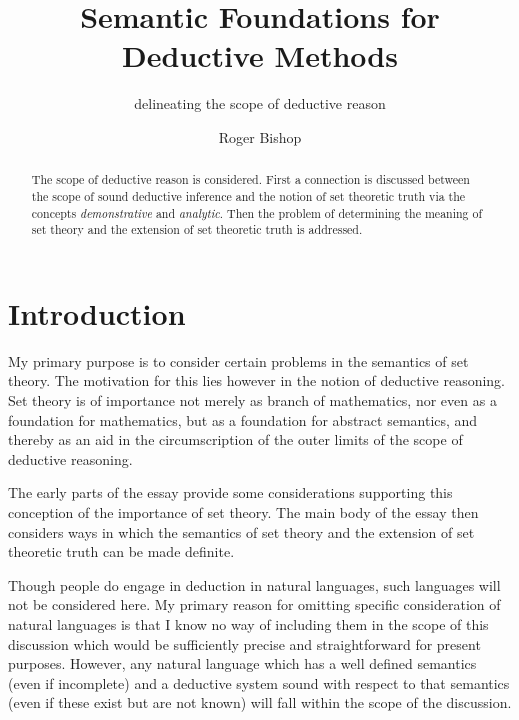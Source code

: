 \documentclass[numreferences]{rbjk}
\begin{document}
                                                                                   
\begin{article}
\begin{opening}  
\title{Semantic Foundations for Deductive Methods}
\subtitle{delineating the scope of deductive reason}
\author{Roger Bishop }

\begin{abstract}

The scope of deductive reason is considered.
First a connection is discussed between the scope of sound deductive inference and the notion of set theoretic truth via the concepts {\it demonstrative} and {\it analytic}.
Then the problem of determining the meaning of set theory and the extension of set theoretic truth is addressed.
\end{abstract}
\end{opening}

\section{Introduction}

My primary purpose is to consider certain problems in the semantics of set theory.
The motivation for this lies however in the notion of deductive reasoning.
Set theory is of importance not merely as branch of mathematics, nor even as a foundation for mathematics, but as a foundation for abstract semantics, and thereby as an aid in the circumscription of the outer limits of the scope of deductive reasoning.

The early parts of the essay provide some considerations supporting this conception of the importance of set theory.
The main body of the essay then considers ways in which the semantics of set theory and the extension of set theoretic truth can be made definite.

Though people do engage in deduction in natural languages, such languages will not be considered here.
My primary reason for omitting specific consideration of natural languages is that I know no way of including them in the scope of this discussion which would be sufficiently precise and straightforward for present purposes.
However, any natural language which has a well defined semantics (even if incomplete) and a deductive system sound with respect to that semantics (even if these exist but are not known) will fall within the scope of the discussion.


\end{article}
\end{document}
